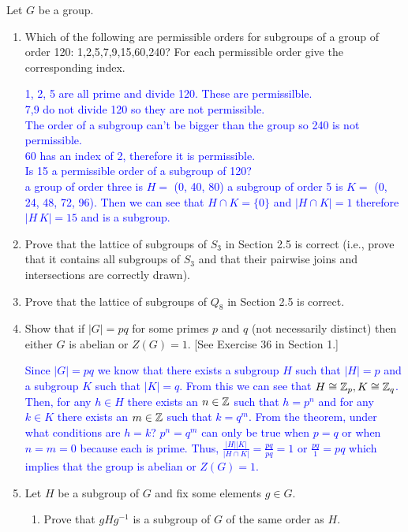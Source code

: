 \documentclass[10pt,a4paper]{report}
\newcommand{\BLUE}[1]{\textcolor{blue}{#1}}
\begin{document}
Let $G$ be a group.
\begin{enumerate}
	\item Which of the following are permissible orders for subgroups of a group of order 120: 1,2,5,7,9,15,60,240?  For each permissible order give the corresponding index.
	
	\BLUE{1, 2, 5 are all prime and divide 120.  These are permissilble.\\
		7,9 do not divide 120 so they are not permissible.\\
		The order of a subgroup can't be bigger than the group so 240 is not permissible.\\
		60 has an index of 2, therefore it is permissible.\\
		Is 15 a permissible order of a subgroup of 120? \\
		a group of order three is $H=$ (0, 40, 80)  a subgroup of order 5 is $K=$ (0, 24, 48, 72, 96).  Then we can see that $H \cap K = \{0\}$ and $|H \cap K|=1$ therefore $|H\,K| = 15$ and is a subgroup.
		}
	
	\item Prove that the lattice of subgroups of $S_3$ in Section 2.5 is correct (i.e., prove that it contains all subgroups of $S_3$ and that their pairwise joins and intersections are correctly drawn).
	
	\item Prove that the lattice of subgroups of $Q_8$ in Section 2.5 is correct.
	
	\item Show that if $|G|=pq$ for some primes $p$ and $q$  (not necessarily distinct) then either $G$ is abelian or $Z(G) = 1$.  [See Exercise 36 in Section 1.]
	
	\BLUE{Since $|G| = pq$ we know that there exists a subgroup $H$ such that $|H|=p$ and a subgroup $K$  such that $|K|=q$.  From this we can see that $H \cong \mathbb{Z}_p, K \cong \mathbb{Z}_q$.  Then, for any $h \in H$ there exists an $n \in \mathbb{Z}$ such that $h = p^n$ and for any $k \in K$ there exists an $m \in \mathbb{Z}$ such that $k=q^m$. From the theorem, under what conditions are $h=k$?  $p^n=q^m$ can only be true when $p=q$ or when $n=m=0$ because each is prime.  Thus, $\frac{|H||K|}{|H\cap K|} = \frac{pq}{pq}=1$ or $\frac{pq}{1}=pq$ which implies that the group is abelian or $Z(G)=1$.
	}
	
	\item Let $H$ be a subgroup of $G$ and fix some elements $g \in G$.
	\begin{enumerate}
		\item Prove that $gHg^{-1}$ is a subgroup of $G$ of the same order as $H$.
		

\end{enumerate}
\end{enumerate}
\end{document}
